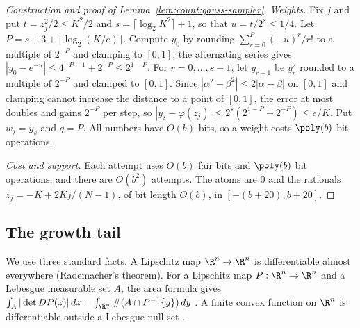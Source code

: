 \begin{proof}[Construction and proof of Lemma~\ref{lem:count:gauss-sampler}]
\emph{Weights.} Fix $j$ and put $t=z_j^2/2\le K^2/2$ and
$s=\lceil\log_2K^2\rceil+1$, so that $u=t/2^s\le1/4$. Let $P=s+3+\lceil\log_2(K/e)\rceil$.
Compute $y_0$ by rounding $\sum_{r=0}^{P}(-u)^r/r!$ to a multiple of $2^{-P}$
and clamping to $[0,1]$; the alternating series gives
$|y_0-e^{-u}|\le4^{-P-1}+2^{-P}\le2^{1-P}$. For
$r=0,\dots,s-1$, let $y_{r+1}$ be $y_r^2$ rounded to a multiple of $2^{-P}$
and clamped to $[0,1]$. Since $|\alpha^2-\beta^2|\le2|\alpha-\beta|$ on $[0,1]$
and clamping cannot increase the distance to a point of $[0,1]$, the error at
most doubles and gains $2^{-P}$ per step, so
$|y_s-\varphi(z_j)|\le2^s(2^{1-P}+2^{-P})\le e/K$. Put $w_j=y_s$ and $q=P$.
All numbers have $O(b)$ bits, so a weight costs $\poly(b)$ bit operations.

\emph{Cost and support.} Each attempt uses $O(b)$ fair bits and $\poly(b)$ bit
operations, and there are $O(b^2)$ attempts. The atoms are $0$ and the
rationals $z_j=-K+2Kj/(N-1)$, of bit length $O(b)$, in $[-(b+20),b+20]$.
\end{proof}

\subsection{The growth tail}

We use three standard facts. A Lipschitz map $\R^n\to\R^n$ is differentiable
almost everywhere (Rademacher's theorem). For a Lipschitz map
$P:\R^n\to\R^n$ and a Lebesgue measurable set $A$, the area formula gives
$\int_A|\det DP(z)|\,dz=\int_{\R^n}\#(A\cap P^{-1}\{y\})\,dy$
\cite{evans2015-measure-theory-and-fine,federer1969-geometric-measure-theory}.
A finite convex function on $\R^n$ is differentiable outside a Lebesgue null
set \cite{rockafellar1970-convex-analysis}.

